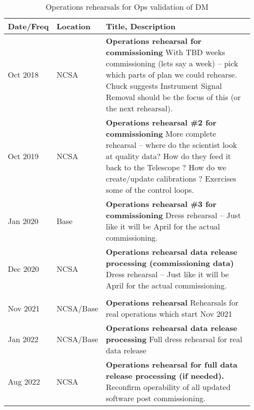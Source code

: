 \begin{longtable} {|l|l|p{}|}
	\caption{Operations rehearsals for Ops validation of DM \label{tab:ors}}\\  %
	\hline
\textbf{Date/Freq} &\textbf{Location}& \textbf{Title, Description} \\ \hline

Oct 2018 &  NCSA & \textbf{Operations rehearsal for commissioning }
	With TBD weeks commissioning (lets say a week) -- pick which parts of plan we could rehearse.
	Chuck suggests Instrument Signal Removal should be the focus of this (or the next rehearsal).
	\\ \hline
Oct 2019 & NCSA &  \textbf{Operations rehearsal \#2 for commissioning}
More complete rehearsal -- where do the scientist look at quality data? How do they feed it back to the Telescope ?
How do we create/update calibrations ? Exercises some of the control loops.
\\ \hline
Jan 2020 & Base  &  \textbf{Operations rehearsal \#3 for commissioning}
Dress rehearsal -- Just like it will be April for the actual commissioning.
	\\ \hline
Dec 2020 &  NCSA &  \textbf{Operations rehearsal data release processing (commissioning data)}
	Dress rehearsal -- Just like it will be April for the actual commissioning.
	\\ \hline

	\\ \hline

Nov 2021 &  NCSA/Base &  \textbf{Operations rehearsal}
Rehearsals for real operations which start  Nov 2021
	\\ \hline
Jan 2022 &  NCSA/Base &  \textbf{Operations rehearsal data release processing}
Full dress rehearsal for real data release
	\\ \hline

Aug 2022 &  NCSA &  \textbf{Operations rehearsal for full data release processing (if needed).}
Reconfirm operability of all updated software post commissioning.
	\\ \hline

\end{longtable}
